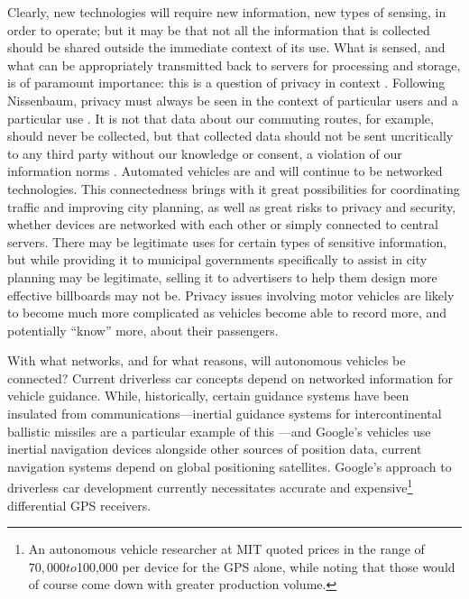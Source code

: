 Clearly, new technologies will require new information, new types of
sensing, in order to operate; but it may be that not all the
information that is collected should be shared outside the immediate
context of its use. What is sensed, and what can be appropriately
transmitted back to servers for processing and storage, is of
paramount importance: this is a question of privacy in context \cite{nissenbaum}.
Following Nissenbaum, privacy must always be seen in the context of
particular users and a particular use \cite[p. 2]{nissenbaum}. It is not that data about our
commuting routes, for example, should never be collected, but that collected data
should not be sent uncritically to any third party without our
knowledge or consent, a violation of our information norms \cite[p.
  3]{nissenbaum}. 
Automated vehicles are and will continue to be networked
technologies. This connectedness brings with it great possibilities
for coordinating traffic and improving city planning, as well as great
risks to privacy and security, whether devices are networked with each
other or simply connected to central servers. There
may be legitimate uses for certain types of sensitive information, but
while providing it to municipal governments specifically to assist in
city planning may be legitimate, selling it to advertisers to help
them design more effective billboards may not be. Privacy issues
involving motor vehicles are likely to become much more complicated as
vehicles become able to record more, and potentially ``know'' more,
about their passengers.



With what networks, and for what reasons, will autonomous vehicles be
connected? Current driverless car concepts depend on networked
information for vehicle guidance. While, historically, certain
guidance systems have been insulated from communications---inertial
guidance systems for intercontinental ballistic
missiles are a particular example of this \cite{mackenzie}---and
Google's vehicles use inertial navigation devices \cite{knightFurther}
alongside other sources of position data, current navigation systems
depend on global positioning satellites. Google's approach to
driverless car development currently necessitates accurate
and expensive\footnote{An autonomous vehicle researcher at MIT
  quoted prices in the range of $70,000 to $100,000 per device for the
GPS alone, while noting that those would of course come down with
greater production volume.} differential GPS receivers.

